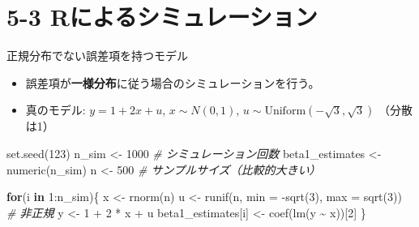 \documentclass[
  ignorenonframetext,
]{beamer}
\newenvironment{Shaded}{\begin{snugshade}}{\end{snugshade}}
\newcommand{\AttributeTok}[1]{\textcolor[rgb]{0.77,0.63,0.00}{#1}}
\newcommand{\CommentTok}[1]{\textcolor[rgb]{0.56,0.35,0.01}{\textit{#1}}}
\newcommand{\ControlFlowTok}[1]{\textcolor[rgb]{0.13,0.29,0.53}{\textbf{#1}}}
\newcommand{\DecValTok}[1]{\textcolor[rgb]{0.00,0.00,0.81}{#1}}
\newcommand{\FunctionTok}[1]{\textcolor[rgb]{0.00,0.00,0.00}{#1}}
\newcommand{\NormalTok}[1]{#1}
\newcommand{\OtherTok}[1]{\textcolor[rgb]{0.56,0.35,0.01}{#1}}
\newcommand{\SpecialCharTok}[1]{\textcolor[rgb]{0.00,0.00,0.00}{#1}}
\providecommand{\tightlist}{%
  \setlength{\itemsep}{0pt}\setlength{\parskip}{0pt}}
\begin{document}
\hypertarget{rux306bux3088ux308bux30b7ux30dfux30e5ux30ecux30fcux30b7ux30e7ux30f3}{%
\section{5-3
Rによるシミュレーション}\label{rux306bux3088ux308bux30b7ux30dfux30e5ux30ecux30fcux30b7ux30e7ux30f3}}

\begin{frame}[fragile]{正規分布でない誤差項を持つモデル}
\protect\hypertarget{ux6b63ux898fux5206ux5e03ux3067ux306aux3044ux8aa4ux5deeux9805ux3092ux6301ux3064ux30e2ux30c7ux30eb}{}
\begin{itemize}
\tightlist
\item
  誤差項が\textbf{一様分布}に従う場合のシミュレーションを行う。
\item
  真のモデル: \(y = 1 + 2x + u\), \(x \sim N(0, 1)\),
  \(u \sim \text{Uniform}(-\sqrt{3}, \sqrt{3})\) （分散は1）
\end{itemize}

\begin{Shaded}
\begin{Highlighting}[]
\FunctionTok{set.seed}\NormalTok{(}\DecValTok{123}\NormalTok{)}
\NormalTok{n\_sim }\OtherTok{\textless{}{-}} \DecValTok{1000}  \CommentTok{\# シミュレーション回数}
\NormalTok{beta1\_estimates }\OtherTok{\textless{}{-}} \FunctionTok{numeric}\NormalTok{(n\_sim)}
\NormalTok{n }\OtherTok{\textless{}{-}} \DecValTok{500}       \CommentTok{\# サンプルサイズ（比較的大きい）}

\ControlFlowTok{for}\NormalTok{(i }\ControlFlowTok{in} \DecValTok{1}\SpecialCharTok{:}\NormalTok{n\_sim)\{}
\NormalTok{  x }\OtherTok{\textless{}{-}} \FunctionTok{rnorm}\NormalTok{(n)}
\NormalTok{  u }\OtherTok{\textless{}{-}} \FunctionTok{runif}\NormalTok{(n, }\AttributeTok{min =} \SpecialCharTok{{-}}\FunctionTok{sqrt}\NormalTok{(}\DecValTok{3}\NormalTok{), }\AttributeTok{max =} \FunctionTok{sqrt}\NormalTok{(}\DecValTok{3}\NormalTok{)) }\CommentTok{\# 非正規}
\NormalTok{  y }\OtherTok{\textless{}{-}} \DecValTok{1} \SpecialCharTok{+} \DecValTok{2} \SpecialCharTok{*}\NormalTok{ x }\SpecialCharTok{+}\NormalTok{ u}
\NormalTok{  beta1\_estimates[i] }\OtherTok{\textless{}{-}} \FunctionTok{coef}\NormalTok{(}\FunctionTok{lm}\NormalTok{(y }\SpecialCharTok{\textasciitilde{}}\NormalTok{ x))[}\DecValTok{2}\NormalTok{]}
\NormalTok{\}}
\end{Highlighting}
\end{Shaded}
\end{frame}
\end{document}
